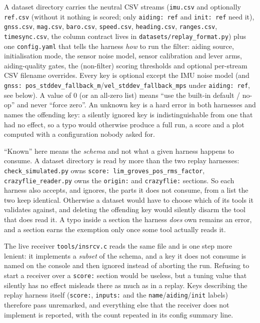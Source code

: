 \documentclass[11pt,a4paper]{article}
\newcommand{\code}[1]{\texttt{#1}}
\begin{document}
A dataset directory carries the neutral CSV streams
(\code{imu.csv} and optionally \code{ref.csv} (without it nothing is scored; only \code{aiding: ref} and \code{init: ref} need it), \code{gnss.csv}, \code{mag.csv},
\code{baro.csv}, \code{speed.csv}, \code{heading.csv}, \code{ranges.csv},
\code{timesync.csv}, the column contract lives in
\code{datasets/replay\_\allowbreak{}format.py})
plus one \code{config.yaml} that tells the harness \emph{how} to run the filter:
aiding source, initialisation mode, the sensor noise model, sensor calibration
and lever arms, aiding-quality gates, the (non-filter) scoring thresholds and
optional per-stream CSV filename overrides.
Every key is optional except the IMU noise model (and \code{gnss:
pos\_\allowbreak{}stddev\_\allowbreak{}fallback\_\allowbreak{}m}/\code{vel\_\allowbreak{}stddev\_\allowbreak{}fallback\_\allowbreak{}mps} under
\code{aiding: ref}, see below). A value of $0$ (or an all-zero list) means
``use the built-in default / no-op'' and never ``force zero''. An unknown key
is a hard error in both harnesses and names the offending key: a silently
ignored key is indistinguishable from one that had no effect, so a typo
would otherwise produce a full run, a score and a plot computed with a
configuration nobody asked for.

``Known'' here means the \emph{schema} and not what a given harness happens to
consume. A dataset directory is read by more than the two replay harnesses:
\code{check\_\allowbreak{}simulated.py} owns \code{score: lim\_\allowbreak{}groves\_\allowbreak{}pos\_\allowbreak{}rms\_\allowbreak{}factor},
\code{crazyflie\_\allowbreak{}reader.py} owns the \code{origin:} and \code{crazyflie:}
sections. So each harness also accepts, and ignores, the parts it does not
consume, from a list the two keep identical. Otherwise a dataset would have to
choose which of its tools it validates against, and deleting the offending key
would silently disarm the tool that does read it. A typo inside a section the
harness \emph{does} own remains an error, and a section earns the exemption
only once some tool actually reads it.

\medskip
\noindent The live receiver \code{tools/insrcv.c} reads the same file and is one
step more lenient: it implements a \emph{subset} of the schema, and a key it
does not consume is named on the console and then ignored instead of aborting
the run. Refusing to start a receiver over a \code{score:} section would be
useless, but a tuning value that silently has no effect misleads there as much
as in a replay. Keys describing the replay harness itself (\code{score:},
\code{inputs:} and the \code{name}/\code{aiding}/\code{init} labels) therefore pass
unremarked, and everything else that the receiver does not implement is reported,
with the count repeated in its config summary line.
\end{document}
